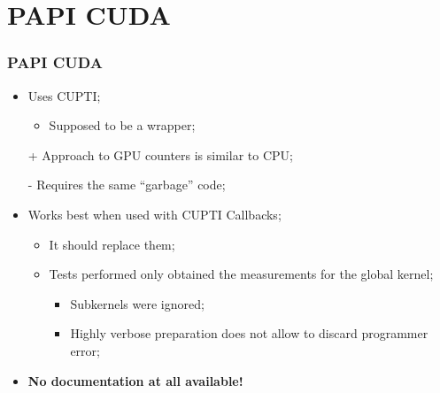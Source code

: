 \section{PAPI CUDA}

\begin{frame}
	\frametitle{PAPI CUDA}
	\begin{itemize}
		\item Uses CUPTI;
		\begin{itemize}
			\item Supposed to be a wrapper;
		\end{itemize}
		\vfill
		\item [+] Approach to GPU counters is similar to CPU;
		\vfill
		\item [-] Requires the same ``garbage'' code;
		\vfill
		\item Works best when used with CUPTI Callbacks;
		\begin{itemize}
			\item It should replace them;
			\item Tests performed only obtained the measurements for the global kernel;
			\begin{itemize}
				\item Subkernels were ignored;
				\item Highly verbose preparation does not allow to discard programmer error;
			\end{itemize}
		\end{itemize}
		\vfill
		\item \textbf{\larger No documentation at all available!}
	\end{itemize}
\end{frame}
